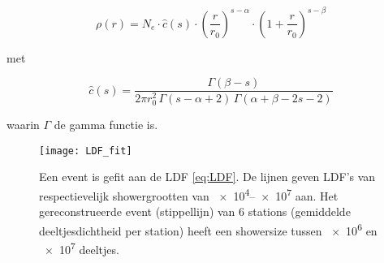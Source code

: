 \begin{equation}
\rho(r) = N_e \cdot \hat{c}(s) \cdot \left(\frac{r}{r_0}\right)^{s-\alpha} \cdot \left(1 + \frac{r}{r_0}\right)^{s-\beta}
\label{eq:LDF}
\end{equation}

met

\begin{equation}
\hat{c}(s) = \frac{\Gamma(\beta-s)}{2\pi r_0^2 \, \Gamma(s-\alpha+2) \, \Gamma(\alpha+\beta-2s-2)}
\label{eq:gamma}
\end{equation}

waarin $\Gamma$ de gamma functie is.

\begin{figure}
    \centering
    \texttt{[image: LDF\_fit]}
    \caption{Een event is gefit aan de LDF \eqref{eq:LDF}. De lijnen geven
    LDF’s van respectievelijk showergrootten van \numrange{e4}{e7} aan. Het
    gereconstrueerde event (stippellijn) van 6 stations (gemiddelde deeltjesdichtheid
    per station) heeft een showersize tussen \num{e6} en \num{e7} deeltjes.}
    \label{fig:LDF_fit}
\end{figure}


